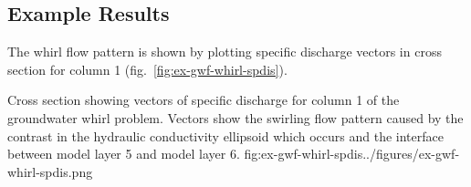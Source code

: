 

\subsection{Example Results}

The whirl flow pattern is shown by plotting specific discharge vectors in cross section for column 1 (fig.~\ref{fig:ex-gwf-whirl-spdis}).  

\begin{StandardFigure}{
                                     Cross section showing vectors of specific discharge for column 1 of the groundwater whirl problem.  Vectors show the swirling flow pattern caused by the contrast in the hydraulic conductivity ellipsoid which occurs and the interface between model layer 5 and model layer 6.
                                     }{fig:ex-gwf-whirl-spdis}{../figures/ex-gwf-whirl-spdis.png}
\end{StandardFigure}                                 
